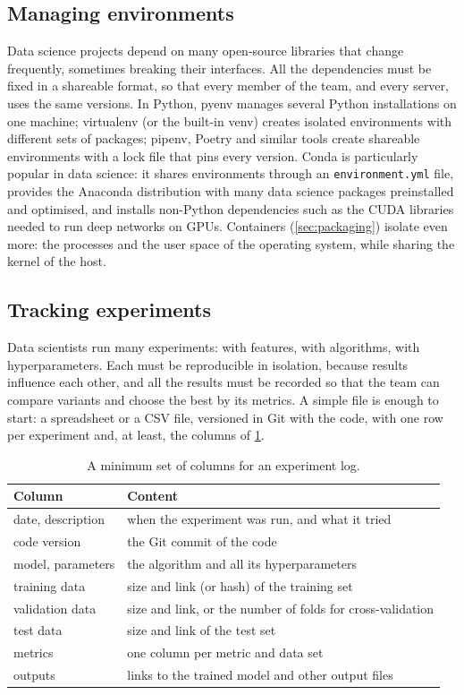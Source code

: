 \subsection{Managing environments}

Data science projects depend on many open-source libraries that change frequently, sometimes breaking
their interfaces. All the dependencies must be fixed in a shareable format, so that every member of the
team, and every server, uses the same versions. In Python, pyenv manages several Python installations on
one machine; virtualenv (or the built-in venv) creates isolated environments with different sets of
packages; pipenv, Poetry and similar tools create shareable environments with a lock file that pins every
version. Conda is particularly popular in data science: it shares environments through an
\texttt{environment.yml} file, provides the Anaconda distribution with many data science packages
preinstalled and optimised, and installs non-Python dependencies such as the CUDA libraries needed to run
deep networks on GPUs. Containers (\cref{sec:packaging}) isolate even more: the processes and the user space of the operating
system, while sharing the kernel of the host.

\subsection{Tracking experiments}

Data scientists run many experiments: with features, with algorithms, with hyperparameters. Each must be
reproducible in isolation, because results influence each other, and all the results must be recorded so
that the team can compare variants and choose the best by its metrics. A simple file is enough to start: a
spreadsheet or a CSV file, versioned in Git with the code, with one row per experiment and, at least, the
columns of \cref{tab:tracking}.

\begin{table}[htbp]
\centering\small
\caption{A minimum set of columns for an experiment log.}\label{tab:tracking}
\begin{tabularx}{\textwidth}{@{}lX@{}}
\toprule
Column & Content\\
\midrule
date, description & when the experiment was run, and what it tried\\
code version & the Git commit of the code\\
model, parameters & the algorithm and all its hyperparameters\\
training data & size and link (or hash) of the training set\\
validation data & size and link, or the number of folds for cross-validation\\
test data & size and link of the test set\\
metrics & one column per metric and data set\\
outputs & links to the trained model and other output files\\
\bottomrule
\end{tabularx}
\end{table}

